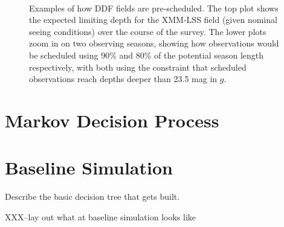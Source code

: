 \documentclass[]{aastex631}
\begin{document}
\begin{figure}
    \\
    \caption{Examples of how DDF fields are pre-scheduled. The top plot shows the expected limiting depth for the XMM-LSS field (given nominal seeing conditions) over the course of the survey. The lower plots zoom in on two observing seasons, showing how observations would be scheduled using 90\% and 80\% of the potential season length respectively, with both using the constraint that scheduled observations reach depths deeper than 23.5 mag in $g$.}
    \label{fig:ddf_examples}
\end{figure}

\section{Markov Decision Process}






\section{Baseline Simulation}

Describe the basic decision tree that gets built. 


XXX--lay out what at baseline simulation looks like


          
{}

\end{document}
